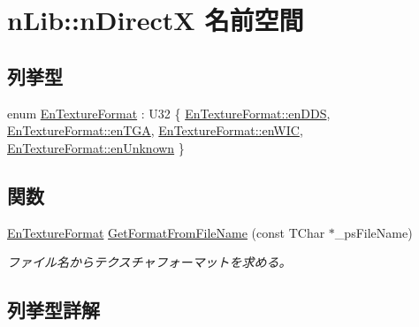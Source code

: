 \hypertarget{namespacen_lib_1_1n_direct_x}{}\section{n\+Lib\+:\+:n\+Direct\+X 名前空間}
\label{namespacen_lib_1_1n_direct_x}
\subsection*{列挙型}
\begin{DoxyCompactItemize}
\item 
enum \hyperlink{namespacen_lib_1_1n_direct_x_a47fcba27656dfc022d6e7ca2a505da65}{En\+Texture\+Format} \+: U32 \{ \hyperlink{namespacen_lib_1_1n_direct_x_a47fcba27656dfc022d6e7ca2a505da65a0ef85dd5421dc11a9c32d1899179fdc6}{En\+Texture\+Format\+::en\+D\+D\+S}, 
\hyperlink{namespacen_lib_1_1n_direct_x_a47fcba27656dfc022d6e7ca2a505da65a177b47a1d545aa019566e000f864c315}{En\+Texture\+Format\+::en\+T\+G\+A}, 
\hyperlink{namespacen_lib_1_1n_direct_x_a47fcba27656dfc022d6e7ca2a505da65af177135aa7049c96dae4042de6a61a85}{En\+Texture\+Format\+::en\+W\+I\+C}, 
\hyperlink{namespacen_lib_1_1n_direct_x_a47fcba27656dfc022d6e7ca2a505da65af3df068cd5f642cd9e12f4f73d215ccf}{En\+Texture\+Format\+::en\+Unknown}
 \}
\end{DoxyCompactItemize}
\subsection*{関数}
\begin{DoxyCompactItemize}
\item 
\hyperlink{namespacen_lib_1_1n_direct_x_a47fcba27656dfc022d6e7ca2a505da65}{En\+Texture\+Format} \hyperlink{namespacen_lib_1_1n_direct_x_a3053207f51c0297f5bc24935c0bc7edc}{Get\+Format\+From\+File\+Name} (const T\+Char $\ast$\+\_\+ps\+File\+Name)
\begin{DoxyCompactList}\small\item\em ファイル名からテクスチャフォーマットを求める。 \end{DoxyCompactList}\end{DoxyCompactItemize}


\subsection{列挙型詳解}
\hypertarget{namespacen_lib_1_1n_direct_x_a47fcba27656dfc022d6e7ca2a505da65}{}
